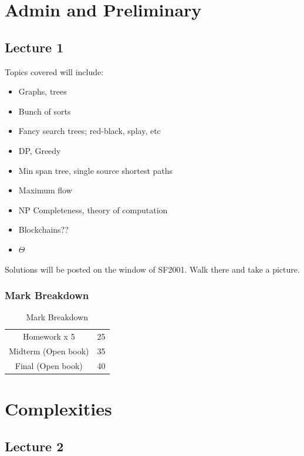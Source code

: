 \documentclass[10pt]{article}
\begin{document}

\section{Admin and Preliminary}

\subsection{Lecture 1}

Topics covered will include:
\begin{itemize}
	\item Graphs, trees
	\item Bunch of sorts
	\item Fancy search trees; red-black, splay, etc
	\item DP, Greedy
	\item Min span tree, single source shortest paths
	\item Maximum flow
	\item NP Completeness, theory of computation
	\item Blockchains??
	\item $ \Theta $ 
\end{itemize}

Solutions will be posted on the window of SF2001. Walk there and take a picture.

\subsubsection{Mark Breakdown}

\begin{table}[H]
	\centering
	\caption{Mark Breakdown}
	\begin{tabular}{|c|c|}
		\hline
		Homework x 5 & 25 \\
		Midterm (Open book) & 35 \\
		Final (Open book) & 40\\
		\hline
	\end{tabular}
\end{table}



\section{Complexities}


\subsection{Lecture 2}
\end{document}
